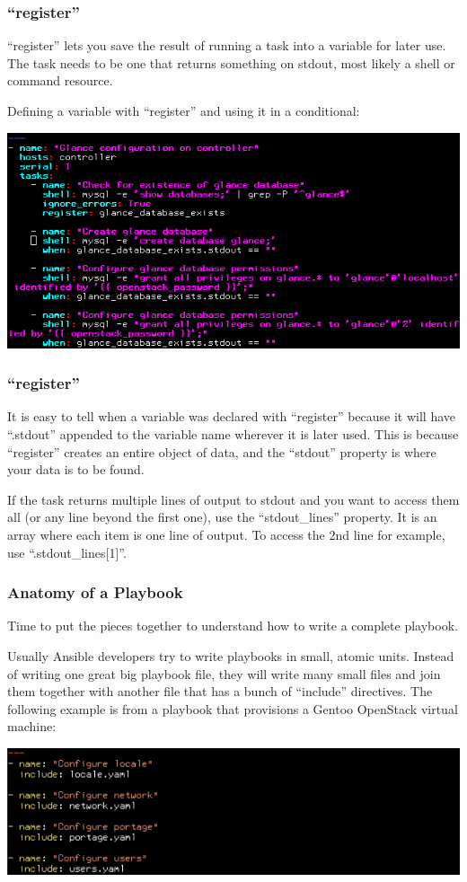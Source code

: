 \documentclass[helvetica,english,utf8,notitle,nologo]{beamer}
\begin{document}
\begin{frame}
  \frametitle{``register''}

  ``register'' lets you save the result of running a task into a
  variable for later use. The task needs to be one that returns
  something on stdout, most likely a shell or command resource.

  Defining a variable with ``register'' and using it in a conditional:

  \includegraphics[scale=0.44]{img_15}
\end{frame}

\begin{frame}
  \frametitle{``register''}

  It is easy to tell when a variable was declared with ``register''
  because it will have ``.stdout'' appended to the variable name
  wherever it is later used. This is because ``register'' creates an
  entire object of data, and the ``stdout'' property is where your
  data is to be found.

  If the task returns multiple lines of output to stdout and you want
  to access them all (or any line beyond the first one), use the
  ``stdout\_lines'' property. It is an array where each item is one
  line of output. To access the 2nd line for example, use
  ``.stdout\_lines[1]''.
\end{frame}

\begin{frame}
  \frametitle{Anatomy of a Playbook}

  Time to put the pieces together to understand how to write a
  complete playbook.

  Usually Ansible developers try to write playbooks in small, atomic
  units. Instead of writing one great big playbook file, they will
  write many small files and join them together with another file that
  has a bunch of ``include'' directives. The following example is from
  a playbook that provisions a Gentoo OpenStack virtual machine:

  \includegraphics[scale=0.44]{img_16}
\end{frame}
\end{document}
